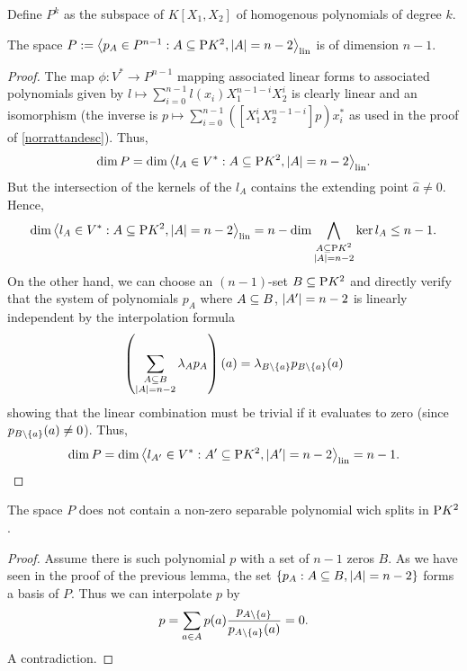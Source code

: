 \begin{definition}
    Define $P^k$ as the subspace of $K[X_1,X_2]$ of homogenous polynomials of degree $k$.
\end{definition}

\begin{lemma}
    The space $P:=\gen[\lin]{p_A\in P^{n-1}:A\setleq \proj{K^2},\card A=n-2}$ is of dimension $n-1$.
\end{lemma}

\begin{proof}
    The map $\phi:V^{\ast}\to P^{n-1}$ mapping associated linear forms to associated polynomials given by $l\mapsto \sum_{i=0}^{n-1}{l(x_i)X_1^{n-1-i}X_2^i}$ is clearly linear and an isomorphism (the inverse is $p\mapsto\sum_{i=0}^{n-1}{([X_1^i X_2^{n-1-i}]p)x_i^{\ast}}$ as used in the proof of \autoref{norrattandesc}). Thus,
    $$
\dim{P}=\dim\gen[\lin]{l_A\in V^{\ast}:A\setleq \proj{K^2},\card A=n-2}.
$$
But the intersection of the kernels of the $l_A$ contains the extending point $\hat{a}\neq 0$. Hence, 
$$
\dim\gen[\lin]{l_A\in V^{\ast}:A\setleq \proj{K^2},\card A=n-2}=n-\dim\bigmeet_{\substack{A\setleq\proj{K^2}\\ \card A=n-2}}{\ker{l_A}}\leq n-1.
$$
On the other hand, we can choose an $(n-1)$-set $B\subseteq \mathrm{P}{K^2}$ and directly verify that the system of polynomials $p_A$ where $A\subseteq B$, $\left|A'\right|=n-2$ is linearly independent by the interpolation formula
$$
\left(\sum_{\substack{A\subseteq B\\ \left|A\right|=n-2}}{\lambda_A p_A}\right)(a)=\lambda_{B\setminus\left\{a\right\}}p_{B\setminus\left\{a\right\}}(a)
$$
showing that the linear combination must be trivial if it evaluates to zero (since $p_{B\setminus\left\{a\right\}}(a)\neq 0$).
Thus,
$$
\dim{P}=\dim\gen[\lin]{l_{A'}\in V^{\ast}:A'\setleq \proj{K^2},\card{A'}=n-2}=n-1.
$$
\end{proof}

\begin{lemma}
    The space $P$ does not contain a non-zero separable polynomial wich splits in $\mathrm{P}{K^2}$.
\end{lemma}

\begin{proof}
    Assume there is such polynomial $p$ with a set of $n-1$ zeros $B$.
    As we have seen in the proof of the previous lemma, the set $\left\{p_A:A\subseteq B,\left|A\right|=n-2\right\}$ forms a basis of $P$. Thus we can interpolate $p$ by
    $$
    p=\sum_{a\in A}{p(a)\frac{p_{A\setminus\left\{a\right\}}}{p_{A\setminus\left\{a\right\}}(a)}}=0.
    $$
    A contradiction.
\end{proof}


